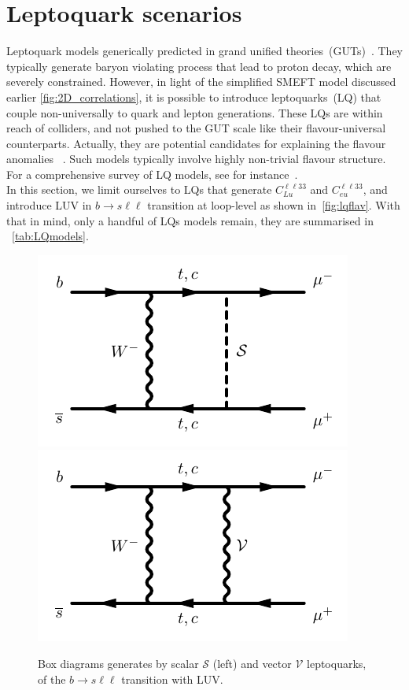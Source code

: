 \section{Leptoquark scenarios}
\label{sec:mod_Leptoquarks}
Leptoquark models generically predicted in grand unified  theories~(GUTs)~\cite{Pati:1974yy,PhysRevLett.32.438}. They typically generate baryon violating process that lead to proton decay, which are severely constrained. However, in light of the simplified SMEFT model discussed earlier \autoref{fig:2D_correlations}, it is possible to introduce leptoquarks~(LQ) that couple non-universally to quark and lepton generations.  These LQs are within reach of colliders, and not pushed to the GUT scale like their flavour-universal counterparts. Actually, they are potential candidates for explaining the flavour anomalies ~\cite{Camargo-Molina:2018cwu,Coy:2019rfr}.  Such models typically involve highly non-trivial flavour structure.  For a comprehensive survey of LQ models, see for instance~\cite{Buchmuller:1986zs,delAguila:2010mx,Alonso:2015sja,Dorsner:2016wpm,deBlas:2017xtg}. \\
In this section, we limit ourselves to LQs that generate  $C_ {Lu}^{\ell \ell33}$ and $C_{eu}^{\ell \ell33} $, and introduce LUV in $b \to s \ell \ell$ transition at loop-level as shown in~\autoref{fig:lqflav}. With that in mind, only a handful of LQs models remain, they are summarised in ~\autoref{tab:LQmodels}.
\begin{figure}[htpb!]
	\centering 
	\includegraphics[width=0.45\linewidth]{figures/x_bsllSLQ}
	\includegraphics[width=0.45\linewidth]{figures/x_bsllVLQ}
	\caption{Box diagrams generates by scalar $\mathcal S$ (left) and vector $\mathcal V$ leptoquarks, of the $b \to s \ell \ell$ transition with LUV. }    
	\label{fig:lqflav}
\end{figure}
